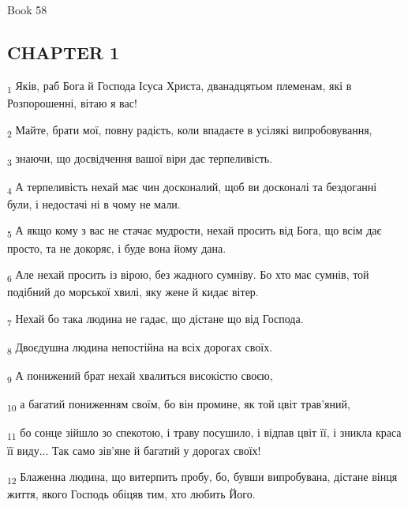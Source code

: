Book 58
\subsection{CHAPTER 1}
\begin{tcolorbox}
\textsubscript{1} Яків, раб Бога й Господа Ісуса Христа, дванадцятьом племенам, які в Розпорошенні, вітаю я вас!
\end{tcolorbox}
\begin{tcolorbox}
\textsubscript{2} Майте, брати мої, повну радість, коли впадаєте в усілякі випробовування,
\end{tcolorbox}
\begin{tcolorbox}
\textsubscript{3} знаючи, що досвідчення вашої віри дає терпеливість.
\end{tcolorbox}
\begin{tcolorbox}
\textsubscript{4} А терпеливість нехай має чин досконалий, щоб ви досконалі та бездоганні були, і недостачі ні в чому не мали.
\end{tcolorbox}
\begin{tcolorbox}
\textsubscript{5} А якщо кому з вас не стачає мудрости, нехай просить від Бога, що всім дає просто, та не докоряє, і буде вона йому дана.
\end{tcolorbox}
\begin{tcolorbox}
\textsubscript{6} Але нехай просить із вірою, без жадного сумніву. Бо хто має сумнів, той подібний до морської хвилі, яку жене й кидає вітер.
\end{tcolorbox}
\begin{tcolorbox}
\textsubscript{7} Нехай бо така людина не гадає, що дістане що від Господа.
\end{tcolorbox}
\begin{tcolorbox}
\textsubscript{8} Двоєдушна людина непостійна на всіх дорогах своїх.
\end{tcolorbox}
\begin{tcolorbox}
\textsubscript{9} А понижений брат нехай хвалиться високістю своєю,
\end{tcolorbox}
\begin{tcolorbox}
\textsubscript{10} а багатий пониженням своїм, бо він промине, як той цвіт трав'яний,
\end{tcolorbox}
\begin{tcolorbox}
\textsubscript{11} бо сонце зійшло зо спекотою, і траву посушило, і відпав цвіт її, і зникла краса її виду... Так само зів'яне й багатий у дорогах своїх!
\end{tcolorbox}
\begin{tcolorbox}
\textsubscript{12} Блаженна людина, що витерпить пробу, бо, бувши випробувана, дістане вінця життя, якого Господь обіцяв тим, хто любить Його.
\end{tcolorbox}
